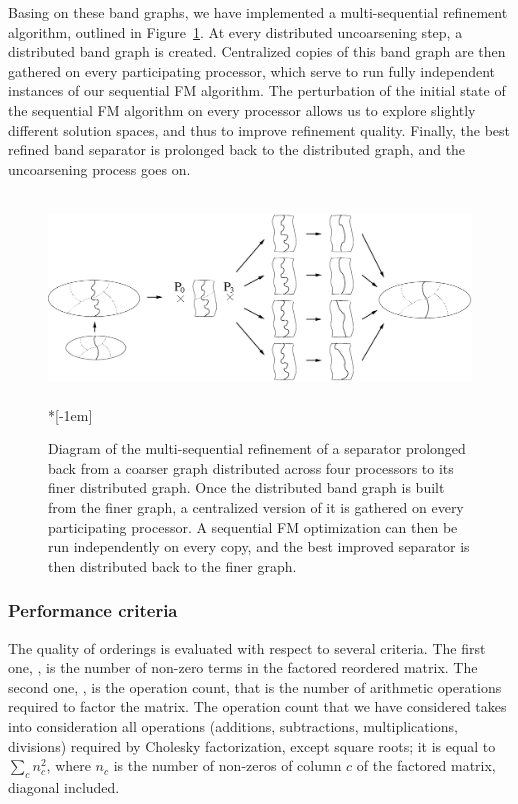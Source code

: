 Basing on these band graphs, we have implemented a multi-sequential
refinement algorithm, outlined in Figure~\ref{fig-multi}. At every
distributed uncoarsening step, a distributed band graph is
created. Centralized copies of this band graph are then gathered on
every participating processor, which serve to run fully independent
instances of our sequential FM algorithm. The perturbation of the
initial state of the sequential FM algorithm on every processor allows
us to explore slightly different solution spaces, and thus to improve
refinement quality. Finally, the best refined band separator is
prolonged back to the distributed graph, and the uncoarsening process
goes on.

\begin{figure}
~\hfill%
\includegraphics[scale=0.28]{p_f_multi.eps}
\hfill~\\*[-1em]
\caption{Diagram of the multi-sequential refinement of a separator
  prolonged back from a coarser graph distributed across four processors
  to its finer distributed graph. Once the distributed band graph is
  built from the finer graph, a centralized version of it is gathered
  on every participating processor. A sequential FM optimization can
  then be run independently on every copy, and the best improved
  separator is then distributed back to the finer graph.}
\label{fig-multi}
\end{figure}

\subsubsection{Performance criteria}
\label{sec-order-perf}

The quality of orderings is evaluated with respect to several
criteria. The first one, \NNZ, is the number of non-zero terms in the
factored reordered matrix. The second one, \OPC, is the operation
count, that is the number of arithmetic operations required to factor
the matrix. The operation count that we have considered takes into
consideration all operations (additions, subtractions,
multiplications, divisions) required by Cholesky factorization, except
square roots; it is equal to $\sum_c n_c^2$, where $n_c$ is the number
of non-zeros of column $c$ of the factored matrix, diagonal included.

